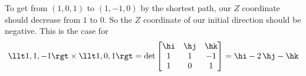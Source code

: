 \begin{solution}
To get from $(1,0,1)$ to $(1,-1,0)$ by the shortest path, our $Z$ 
coordinate should decrease from $1$ to $0$. So the $Z$ coordinate of 
our initial direction should be negative. This is the case for 
\begin{equation*}
\llt 1,1,-1\rgt\times\llt 1,0,1\rgt
=\det\left[\begin{matrix}
                     \hi & \hj & \hk \\
                     1   &  1  & -1 \\
                     1   &  0  &  1
                \end{matrix}\right]
=\hi - 2\,\hj -\hk
\end{equation*}
\end{solution}

